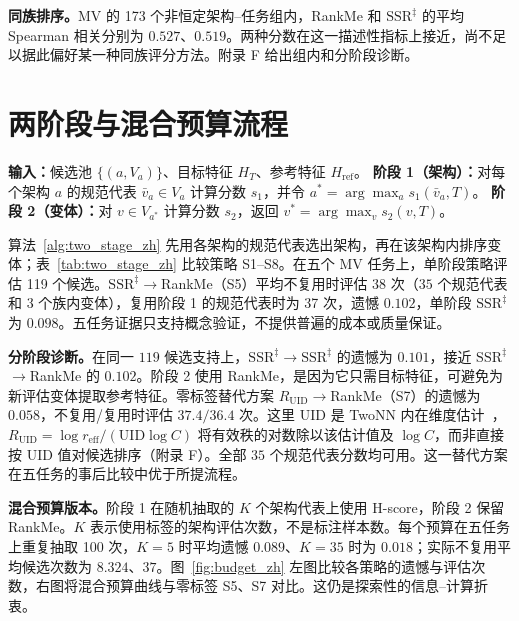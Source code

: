 \documentclass{article}
\newcommand{\reff}{\ensuremath{r_{\mathrm{eff}}}\xspace}
\newcommand{\UID}{\ensuremath{\mathrm{UID}}\xspace}
\newcommand{\SSRdag}{\ensuremath{\mathrm{SSR}^{\ddagger}}\xspace}
\begin{document}
\textbf{同族排序。}MV 的 173 个非恒定架构--任务组内，RankMe 和 \SSRdag 的平均 Spearman 相关分别为 $0.527$、$0.519$。两种分数在这一描述性指标上接近，尚不足以据此偏好某一种同族评分方法。附录 F 给出组内和分阶段诊断。

\section{两阶段与混合预算流程}
\begin{algorithm}[h]
\caption{两阶段无源模型迁移性估计流程}
\label{alg:two_stage_zh}
\begin{algorithmic}[1]
\State \textbf{输入：}候选池 $\{(a,V_a)\}$、目标特征 $H_T$、参考特征 $H_{\mathrm{ref}}$。
\State \textbf{阶段 1（架构）：}对每个架构 $a$ 的规范代表 $\bar v_a\in V_a$ 计算分数 $s_1$，并令 $a^*=\arg\max_a s_1(\bar v_a,T)$。
\State \textbf{阶段 2（变体）：}对 $v\in V_{a^*}$ 计算分数 $s_2$，返回 $v^*=\arg\max_v s_2(v,T)$。
\end{algorithmic}
\end{algorithm}

算法~\ref{alg:two_stage_zh} 先用各架构的规范代表选出架构，再在该架构内排序变体；表~\ref{tab:two_stage_zh} 比较策略 S1--S8。在五个 MV 任务上，单阶段策略评估 119 个候选。\SSRdag$\to$RankMe（S5）平均不复用时评估 $38$ 次（$35$ 个规范代表和 $3$ 个族内变体），复用阶段 1 的规范代表时为 37 次，遗憾 $0.102$，单阶段 \SSRdag 为 $0.098$。五任务证据只支持概念验证，不提供普遍的成本或质量保证。



\textbf{分阶段诊断。}在同一 $119$ 候选支持上，\SSRdag$\to$\SSRdag 的遗憾为 $0.101$，接近 \SSRdag$\to$RankMe 的 $0.102$。阶段 2 使用 RankMe，是因为它只需目标特征，可避免为新评估变体提取参考特征。零标签替代方案 $R_{\mathrm{UID}}\to$RankMe（S7）的遗憾为 $0.058$，不复用/复用时评估 $37.4/36.4$ 次。这里 UID 是 TwoNN 内在维度估计~\citep{facco2017estimating}，$R_{\mathrm{UID}}=\log\reff/(\UID\log C)$ 将有效秩的对数除以该估计值及 $\log C$，而非直接按 UID 值对候选排序（附录 F）。全部 $35$ 个规范代表分数均可用。这一替代方案在五任务的事后比较中优于所提流程。

\textbf{混合预算版本。}阶段 1 在随机抽取的 $K$ 个架构代表上使用 H-score，阶段 2 保留 RankMe。$K$ 表示使用标签的架构评估次数，不是标注样本数。每个预算在五任务上重复抽取 100 次，$K=5$ 时平均遗憾 $0.089$、$K=35$ 时为 $0.018$；实际不复用平均候选次数为 $8.324$、$37$。图~\ref{fig:budget_zh} 左图比较各策略的遗憾与评估次数，右图将混合预算曲线与零标签 S5、S7 对比。这仍是探索性的信息--计算折衷。
\end{document}

